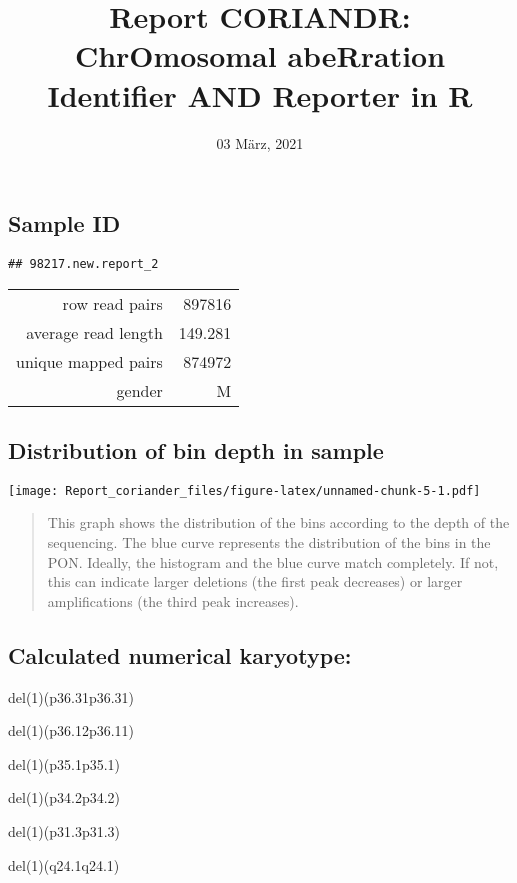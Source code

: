 \documentclass[]{article}
\title{Report CORIANDR: ChrOmosomal abeRration Identifier AND Reporter in R}
\author{}
\date{03 März, 2021}
\begin{document}
\maketitle

\hypertarget{sample-id}{%
\subsection{Sample ID}\label{sample-id}}

\begin{verbatim}
## 98217.new.report_2
\end{verbatim}

\begin{longtable}[]{@{}rr@{}}
\toprule
\endhead
row read pairs & 897816\tabularnewline
average read length & 149.281\tabularnewline
unique mapped pairs & 874972\tabularnewline
gender & M\tabularnewline
\bottomrule
\end{longtable}

\hypertarget{distribution-of-bin-depth-in-sample}{%
\subsection{Distribution of bin depth in
sample}\label{distribution-of-bin-depth-in-sample}}

\texttt{[image: Report\_coriander\_files/figure-latex/unnamed-chunk-5-1.pdf]}

\begin{quote}
This graph shows the distribution of the bins according to the depth of
the sequencing. The blue curve represents the distribution of the bins
in the PON. Ideally, the histogram and the blue curve match completely.
If not, this can indicate larger deletions (the first peak decreases) or
larger amplifications (the third peak increases).
\end{quote}

\hypertarget{calculated-numerical-karyotype}{%
\subsection{Calculated numerical
karyotype:}\label{calculated-numerical-karyotype}}

del(1)(p36.31p36.31)

del(1)(p36.12p36.11)

del(1)(p35.1p35.1)

del(1)(p34.2p34.2)

del(1)(p31.3p31.3)

del(1)(q24.1q24.1)
\end{document}
